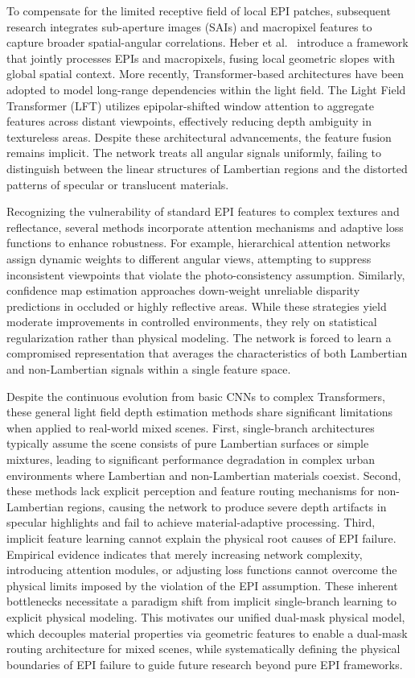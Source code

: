 \documentclass[lettersize,journal]{IEEEtran}
\begin{document}
To compensate for the limited receptive field of local EPI patches, subsequent research integrates sub-aperture images (SAIs) and macropixel features to capture broader spatial-angular correlations. Heber et al.~\cite{honauer2016} introduce a framework that jointly processes EPIs and macropixels, fusing local geometric slopes with global spatial context. More recently, Transformer-based architectures have been adopted to model long-range dependencies within the light field. The Light Field Transformer (LFT) \cite{vaswani2017} utilizes epipolar-shifted window attention to aggregate features across distant viewpoints, effectively reducing depth ambiguity in textureless areas. Despite these architectural advancements, the feature fusion remains implicit. The network treats all angular signals uniformly, failing to distinguish between the linear structures of Lambertian regions and the distorted patterns of specular or translucent materials.

Recognizing the vulnerability of standard EPI features to complex textures and reflectance, several methods incorporate attention mechanisms and adaptive loss functions to enhance robustness. For example, hierarchical attention networks \cite{honauer2016} assign dynamic weights to different angular views, attempting to suppress inconsistent viewpoints that violate the photo-consistency assumption. Similarly, confidence map estimation approaches \cite{honauer2016} down-weight unreliable disparity predictions in occluded or highly reflective areas. While these strategies yield moderate improvements in controlled environments, they rely on statistical regularization rather than physical modeling. The network is forced to learn a compromised representation that averages the characteristics of both Lambertian and non-Lambertian signals within a single feature space.

Despite the continuous evolution from basic CNNs to complex Transformers, these general light field depth estimation methods share significant limitations when applied to real-world mixed scenes. First, single-branch architectures typically assume the scene consists of pure Lambertian surfaces or simple mixtures, leading to significant performance degradation in complex urban environments where Lambertian and non-Lambertian materials coexist. Second, these methods lack explicit perception and feature routing mechanisms for non-Lambertian regions, causing the network to produce severe depth artifacts in specular highlights and fail to achieve material-adaptive processing. Third, implicit feature learning cannot explain the physical root causes of EPI failure. Empirical evidence indicates that merely increasing network complexity, introducing attention modules, or adjusting loss functions cannot overcome the physical limits imposed by the violation of the EPI assumption. These inherent bottlenecks necessitate a paradigm shift from implicit single-branch learning to explicit physical modeling. This motivates our unified dual-mask physical model, which decouples material properties via geometric features to enable a dual-mask routing architecture for mixed scenes, while systematically defining the physical boundaries of EPI failure to guide future research beyond pure EPI frameworks.
\end{document}
